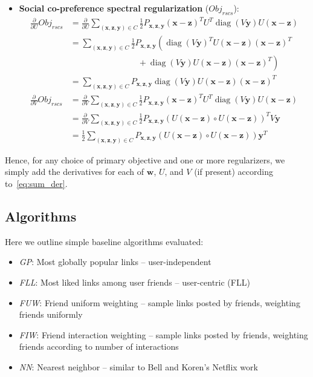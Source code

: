 \documentclass{sig-alternate}
\newcommand{\Obj}{\mathit{Obj}}
\newcommand{\rscs}{\mathit{rscs}}
\newcommand{\diag}{\operatorname{diag}}
\newcommand{\x}{\vec{x}}
\newcommand{\y}{\vec{y}}
\newcommand{\z}{\vec{z}}
\newcommand{\w}{\vec{w}}
\renewcommand{\vec}[1]{\mathbf{#1}}
\begin{document}
\begin{itemize}
\item {\bf Social co-preference spectral regularization} ($\Obj_\rscs$):
\begin{align*}
\frac{\partial}{\partial U} \Obj_\rscs & = \frac{\partial}{\partial U} \sum_{(\x,\z,\y) \in C} \frac{1}{2} P_{\x,\z,\y} (\x - \z)^T U^T \diag(V\y) U (\x - \z)\\
& = \sum_{(\x,\z,\y) \in C} \frac{1}{2} P_{\x,\z,\y} \left( \diag(V\y)^T U (\x - \z) (\x - \z)^T \right.\\
& \left. \qquad \qquad \qquad \qquad + \diag(V\y) U (\x - \z) (\x - \z)^T \right)\\
& = \sum_{(\x,\z,\y) \in C} P_{\x,\z,\y} \diag(V\y) U (\x - \z) (\x - \z)^T\\
\frac{\partial}{\partial V} \Obj_\rscs & = \frac{\partial}{\partial V} \sum_{(\x,\z,\y) \in C} \frac{1}{2} P_{\x,\z,\y} (\x - \z)^T U^T \diag(V\y) U (\x - \z)\\
& = \frac{\partial}{\partial V} \sum_{(\x,\z,\y) \in C} \frac{1}{2} P_{\x,\z,\y} (U(\x-\z) \circ U(\x-\z))^T V\y\\
& = \frac{1}{2} \sum_{(\x,\z,\y) \in C} P_{\x,\z,\y} (U(\x-\z) \circ U(\x-\z)) \y^T
\end{align*}
\end{itemize}

Hence, for any choice of primary objective and one or more regularizers,
we simply add the derivatives for each of $\w$, $U$, and $V$ (if present) 
according to~\eqref{eq:sum_der}.

\subsection{Algorithms}

Here we outline simple baseline algorithms evaluated:
\begin{itemize}
\item {\it GP}: Most globally popular links -- user-independent
\item {\it FLL}: Most liked links among user friends -- user-centric (FLL) 
\item {\it FUW}: Friend uniform weighting -- sample links posted by friends, weighting friends uniformly
\item {\it FIW}: Friend interaction weighting -- sample links posted by friends, weighting friends according to number of interactions
\item {\it NN}: Nearest neighbor -- similar to Bell and Koren's Netflix work
\end{itemize}
\end{document}
